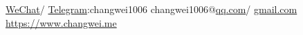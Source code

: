 \documentclass{resume}
\newcommand{\iconsection}[2]{
  \section[\texorpdfstring{#2}{#2}]{\faIcon{#1}\quad #2}
}
\begin{document}
  \sloppy


  \contactInfo
  {\href{https://www.changwei.me/_next/static/media/wechat_changwei1006.bb2a1d9a.jpg}{WeChat}/
  \href{https://t.me/changwei1006}{Telegram}:changwei1006}
  {{changwei1006@}\href{mailto:changwei1006@qq.com}{qq.com}/
  \href{mailto:changwei1006@gmail.com}{gmail.com}}
  {\href{https://www.changwei.me}{https://www.changwei.me}}{}

\end{document}
